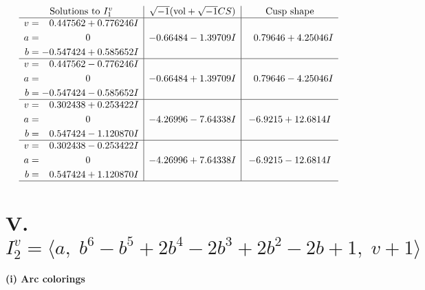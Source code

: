 \documentclass[1p]{elsarticle_modified}
\theoremstyle{definition}
\newcommand{\I}{\sqrt{-1}}
\begin{document}
$$\begin{array}{c|c|c}  
\text{Solutions to }I^v_{1}& \I (\text{vol} + \sqrt{-1}CS) & \text{Cusp shape}\\
 \hline 
\begin{aligned}
v &= \phantom{-}0.447562 + 0.776246 I \\
a &= \phantom{-0.000000 } 0 \\
b &= -0.547424 + 0.585652 I\end{aligned}
 & -0.66484 - 1.39709 I & \phantom{-}0.79646 + 4.25046 I \\ \hline\begin{aligned}
v &= \phantom{-}0.447562 - 0.776246 I \\
a &= \phantom{-0.000000 } 0 \\
b &= -0.547424 - 0.585652 I\end{aligned}
 & -0.66484 + 1.39709 I & \phantom{-}0.79646 - 4.25046 I \\ \hline\begin{aligned}
v &= \phantom{-}0.302438 + 0.253422 I \\
a &= \phantom{-0.000000 } 0 \\
b &= \phantom{-}0.547424 - 1.120870 I\end{aligned}
 & -4.26996 - 7.64338 I & -6.9215 + 12.6814 I \\ \hline\begin{aligned}
v &= \phantom{-}0.302438 - 0.253422 I \\
a &= \phantom{-0.000000 } 0 \\
b &= \phantom{-}0.547424 + 1.120870 I\end{aligned}
 & -4.26996 + 7.64338 I & -6.9215 - 12.6814 I\\
 \hline 
 \end{array}$$\newpage\newpage\renewcommand{\arraystretch}{1}
\centering \section*{V. $I^v_{2}= \langle a,\;b^6- b^5+2 b^4-2 b^3+2 b^2-2 b+1,\;v+1 \rangle$}
\flushleft \textbf{(i) Arc colorings}\\
\end{document}

